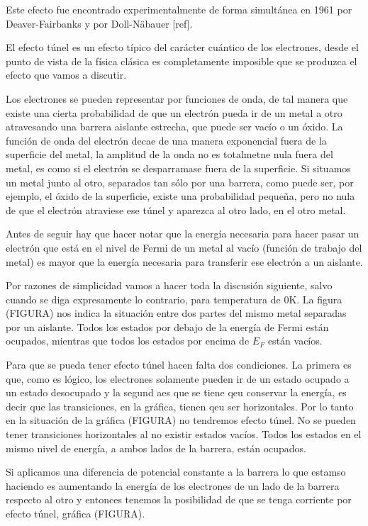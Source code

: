 Este efecto fue encontrado experimentalmente de forma simultánea en 1961 por Deaver-Fairbanks \cite{deaver} y por Doll-Näbauer [ref].

El efecto túnel es un efecto típico del carácter cuántico de los electrones, desde el punto de vista de la física clásica es completamente imposible que se produzca el efecto que vamos a discutir.

Los electrones se pueden representar por funciones de onda, de tal manera que existe una cierta probabilidad de que un electrón pueda ir de un metal a otro atravesando una barrera aislante estrecha, que puede ser vacío o un óxido. La función de onda del electrón decae de una manera exponencial fuera de la superficie del metal, la amplitud de la onda no es totalmetne nula fuera del metal, es como si el electrón se desparramase fuera de la superficie. Si situamos un metal junto al otro, separados tan sólo por una barrera, como puede ser, por ejemplo, el óxido de la superficie, existe una probabilidad pequeña, pero no nula de que el electrón atraviese ese túnel y aparezca al otro lado, en el otro metal.

Antes de seguir hay que hacer notar que la energía necesaria para hacer pasar un electrón que está en el nivel de Fermi de un metal al vacío (función de trabajo del metal) es mayor que la energía necesaria para transferir ese electrón a un aislante.

Por razones de simplicidad vamos a hacer toda la discusión siguiente, salvo cuando se diga expresamente lo contrario, para temperatura de 0K. La figura (FIGURA) nos indica la situación entre dos partes del mismo metal separadas por un aislante. Todos los estados por debajo de la energía de Fermi están ocupados, mientras que todos los estados por encima de $E_F$ están vacíos.

Para que se pueda tener efecto túnel hacen falta dos condiciones. La primera es que, como es lógico, los electrones solamente pueden ir de un estado ocupado a un estado desocupado y la segund aes que se tiene qeu conservar la energía, es decir que las transiciones, en la gráfica, tienen qeu ser horizontales. Por lo tanto en la situación de la gráfica (FIGURA) no tendremos efecto túnel. No se pueden tener transiciones horizontales al no existir estados vacíos. Todos los estados en el mismo nivel de energía, a ambos lados de la barrera, están ocupados.

Si aplicamos una diferencia de potencial constante a la barrera lo que estamso haciendo es aumentando la energía de los electrones de un lado de la barrera respecto al otro y entonces tenemos la posibilidad de que se tenga corriente por efecto túnel, gráfica (FIGURA).

